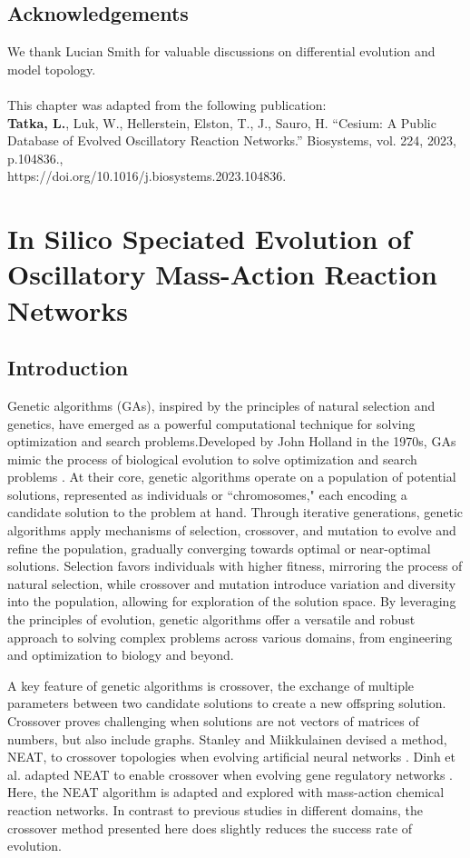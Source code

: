 \documentclass[12pt]{report}
\begin{document}
\section*{Acknowledgements}
We thank Lucian Smith for valuable discussions on differential evolution and model topology. 
\\
\\
This chapter was adapted from the following publication:
\\
\textbf{Tatka, L.}, Luk, W., Hellerstein, Elston, T., J., Sauro, H. “Cesium: A Public Database of Evolved Oscillatory Reaction Networks.”  Biosystems, vol. 224, 2023, p.104836., \\
https://doi.org/10.1016/j.biosystems.2023.104836. 
\\


\chapter{In Silico Speciated Evolution of Oscillatory Mass-Action Reaction Networks}
\label{chap: NetEvolve}
\section{Introduction}
Genetic algorithms (GAs), inspired by the principles of natural selection and genetics, have emerged as a powerful computational technique for solving optimization and search problems.Developed by John Holland in the 1970s, GAs mimic the process of biological evolution to solve optimization and search problems \cite{holland_1975}. At their core, genetic algorithms operate on a population of potential solutions, represented as individuals or ``chromosomes," each encoding a candidate solution to the problem at hand. Through iterative generations, genetic algorithms apply mechanisms of selection, crossover, and mutation to evolve and refine the population, gradually converging towards optimal or near-optimal solutions. Selection favors individuals with higher fitness, mirroring the process of natural selection, while crossover and mutation introduce variation and diversity into the population, allowing for exploration of the solution space. By leveraging the principles of evolution, genetic algorithms offer a versatile and robust approach to solving complex problems across various domains, from engineering and optimization to biology and beyond.

A key feature of genetic algorithms is crossover, the exchange of multiple parameters between two candidate solutions to create a new offspring solution. Crossover proves challenging when solutions are not vectors of matrices of numbers, but also include graphs. Stanley and  Miikkulainen devised a method, NEAT, to crossover topologies when evolving artificial neural networks \cite{stanley_evolving_2002}. Dinh et al. adapted NEAT to enable crossover when evolving gene regulatory networks \cite{dinh_effective_2015}. Here, the NEAT algorithm is adapted and explored with mass-action chemical reaction networks. In contrast to previous studies in different domains, the crossover method presented here does slightly reduces the success rate of evolution. 
\end{document}
